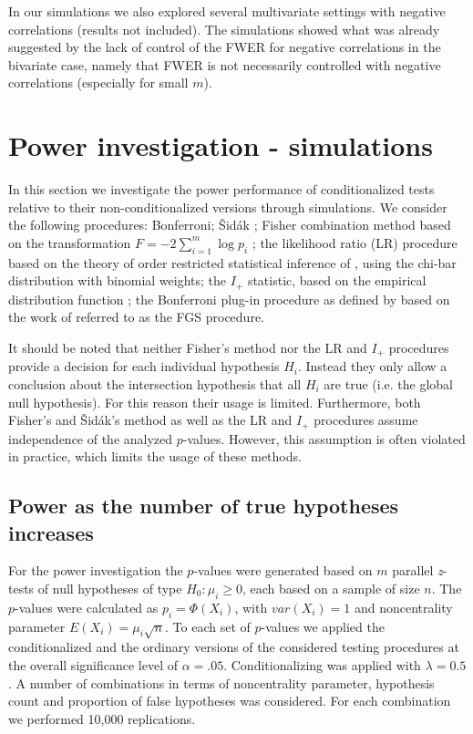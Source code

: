 \documentclass {imsart}
\begin{document}
In our simulations we also explored several multivariate settings with negative correlations (results not included). The simulations showed what was already suggested by the lack of control of the FWER for negative correlations in the bivariate case, namely that FWER is not necessarily controlled with negative correlations (especially for small $m$).



\section{Power investigation - simulations}

In this section we investigate the power performance of conditionalized tests relative to their non-conditionalized versions through simulations. We consider the following procedures: Bonferroni; {\v S}id{\'a}k \citep[attributed to Tippet by][p.~2433]{Davidov2011}; Fisher combination method based on the transformation $F=-2\sum_{i=1}^m\log {p_i}$  \citep[see][p.~2433]{Davidov2011}; the likelihood ratio (LR) procedure based on the theory of order restricted statistical inference of \citet{RobertsonWD}, using the chi-bar distribution with binomial weights; the ${I_+}$ statistic, based on the empirical distribution function \citep[p.~2433]{Davidov2011}; the Bonferroni plug-in procedure as defined by \citet{FG2009} based on the work of \citet{Storey2002} referred to as the FGS procedure.

It should be noted that neither Fisher's method nor the LR and ${I_+}$ procedures provide a decision for each individual hypothesis ${H_i}$. Instead they only allow a conclusion about the intersection hypothesis that all ${H_i}$ are true (i.e. the global null hypothesis). For this reason their usage is limited. Furthermore, both Fisher's and {\v S}id{\'a}k's method as well as the LR and ${I_+}$ procedures assume independence of the analyzed $p$-values. However, this assumption is often violated in practice, which limits the usage of these methods.

\subsection{Power as the number of true hypotheses increases}

For the power investigation the $p$-values were generated based on $m$ parallel \textit{z}-tests of null hypotheses of type $H_0:\mu_i\geq0$, each based on a sample of size $n$. The $p$-values were calculated as $p_i=\Phi(X_i)$, with $var(X_i) = 1$ and noncentrality parameter $E(X_i)=\mu_i \sqrt{n}$. To each set of $p$-values we applied the conditionalized and the ordinary versions of the considered testing procedures at the overall significance level of $\alpha=.05$. Conditionalizing was applied with $\lambda=0.5$. A number of combinations in terms of noncentrality parameter, hypothesis count and proportion of false hypotheses was considered. For each combination we performed 10,000 replications.
\end{document}
